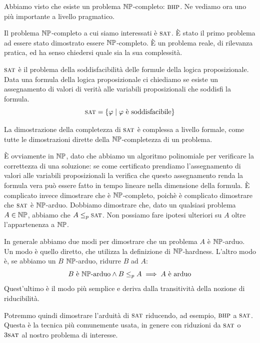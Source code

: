 Abbiamo visto che esiste un problema $\mathbb{NP}$-completo: $\textsc{bhp}$. Ne vediamo ora uno più importante
a livello pragmatico.


Il problema $\mathbb{NP}$-completo a cui siamo interessati è $\textsc{sat}$. È stato il primo problema ad
essere stato dimostrato essere $\mathbb{NP}$-completo. È un problema reale, di rilevanza pratica, ed
ha senso chiedersi quale sia la sua complessità.

$\textsc{sat}$ è il problema della soddisfacibilità delle formule della logica proposizionale. Data una
formula della logica proposizionale ci chiediamo se esiste un assegnamento di valori di verità alle
variabili proposizionali che soddisfi la formula.
\begin{equation*}
    \textsc{sat} = \left\{\varphi \mid \text{$\varphi$ è soddisfacibile}\right\}
\end{equation*}

La dimostrazione della completezza di $\textsc{sat}$ è complessa a livello formale, come tutte le
dimostrazioni dirette della $\mathbb{NP}$-completezza di un problema.

È ovviamente in $\mathbb{NP}$, dato che abbiamo un algoritmo polinomiale per verificare la correttezza
di una soluzione: se come certificato prendiamo l'assegnamento di valori alle variabili
proposizionali la verifica che questo assegnamento renda la formula vera può essere fatto in tempo
lineare nella dimensione della formula. È complicato invece dimostrare che è $\mathbb{NP}$-completo,
poichè è complicato dimostrare che $\textsc{sat}$ è $\mathbb{NP}$-arduo. Dobbiamo dimostrare che, dato un
qualsiasi problema  $A \in \mathbb{NP}$, abbiamo che $A \leq_{p} \textsc{sat}$. Non possiamo fare ipotesi
ulteriori su $A$ oltre l'appartenenza a $\mathbb{NP}$.

In generale abbiamo due modi per dimostrare che un problema $A$ è $\mathbb{NP}$-arduo.
Un modo è quello diretto, che utilizza la definizione di $\mathbb{NP}$-hardness. L'altro modo è, se
abbiamo un $B$ $\mathbb{NP}$-arduo, ridurre $B$ ad $A$:
\begin{equation*}
    B\text{ è $\mathbb{NP}$-arduo} \land B \leq_{p} A \implies \text{$A$ è arduo}
\end{equation*}
Quest'ultimo è il modo più semplice e deriva dalla transitività della nozione di riducibilità.

Potremmo quindi dimostrare l'arduità di $\textsc{sat}$ riducendo, ad esempio, $\textsc{bhp}$ a $\textsc{sat}$. Questa è la
tecnica più comunemente usata, in genere con riduzioni da $\textsc{sat}$ o $3\textsc{sat}$ al nostro problema di
interesse.


